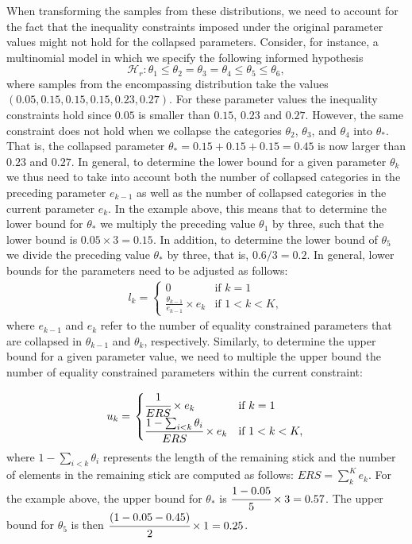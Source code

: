 \documentclass[
  english,
  man,floatsintext]{apa6}
\begin{document}
\begin{appendix}
When transforming the samples from these distributions, we need to
account for the fact that the inequality constraints imposed under the
original parameter values might not hold for the collapsed parameters.
Consider, for instance, a multinomial model in which we specify the
following informed hypothesis
\[\mathcal{H}_r: \theta_1 \leq \theta_2 = \theta_3 = \theta_4 \leq \theta_5 \leq \theta_6,\]
where samples from the encompassing distribution take the values
\((0.05, 0.15, 0.15, 0.15, 0.23, 0.27)\). For these parameter values the
inequality constraints hold since \(0.05\) is smaller than \(0.15\),
\(0.23\) and \(0.27\). However, the same constraint does not hold when
we collapse the categories \(\theta_2\), \(\theta_3\), and \(\theta_4\)
into \(\theta_*\). That is, the collapsed parameter
\(\theta_* = 0.15 + 0.15 + 0.15 = 0.45\) is now larger than \(0.23\) and
\(0.27\). In general, to determine the lower bound for a given parameter
\(\theta_k\) we thus need to take into account both the number of
collapsed categories in the preceding parameter \(e_{k-1}\) as well as
the number of collapsed categories in the current parameter \(e_{k}\).
In the example above, this means that to determine the lower bound for
\(\theta_*\) we multiply the preceding value \(\theta_1\) by three, such
that the lower bound is \(0.05 \times 3 = 0.15\). In addition, to
determine the lower bound of \(\theta_5\) we divide the preceding value
\(\theta_*\) by three, that is, \(0.6/3 = 0.2\). In general, lower
bounds for the parameters need to be adjusted as follows: \begin{align}
l_k = \left.
\begin{cases}
0 & \text{if } k = 1 \\
\frac{\theta_{k - 1}}{e_{k-1}} \times e_k & \text{if } 1 < k < K,
\end{cases}
\right.
\end{align} where \(e_{k-1}\) and \(e_k\) refer to the number of
equality constrained parameters that are collapsed in \(\theta_{k - 1}\)
and \(\theta_{k}\), respectively. Similarly, to determine the upper
bound for a given parameter value, we need to multiple the upper bound
the number of equality constrained parameters within the current
constraint:

\begin{align}
u_k = \left.
\begin{cases}
\cfrac{1}{ERS} \times e_k & \text{if } k = 1 \\
\cfrac{1 - \sum_{i < k} \theta_i}{ERS} \times e_k & \text{if } 1 < k < K,
\end{cases}
\right.
\end{align} where \(1 - \sum_{i < k} \theta_i\) represents the length of
the remaining stick and the number of elements in the remaining stick
are computed as follows: \(ERS = \sum_k^{K} e_k\). For the example
above, the upper bound for \(\theta_*\) is
\(\cfrac{1 - 0.05}{5} \times 3 = 0.57\). The upper bound for
\(\theta_5\) is then \(\cfrac{(1 - 0.05 - 0.45)}{2} \times 1 = 0.25\).


\end{appendix}
\end{document}
